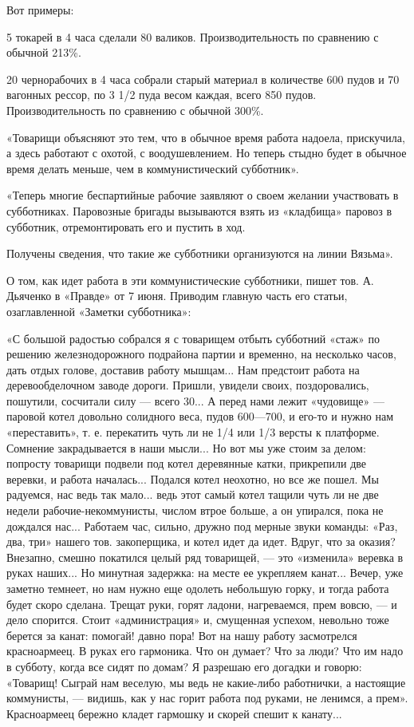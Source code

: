\documentclass[12pt]{article}
\newcommand{\parnum}{(\arabic{parcount})}
\newcounter{parcount}
\newenvironment{parnumbers}{%
  \par%
  \everypar{\noindent \stepcounter{parcount}\marginpar[]{\parnum}}%
}{}
\begin{document}
\begin{parnumbers}
Вот примеры:

5 токарей в 4 часа сделали 80 валиков. Производительность по сравнению с обычной 213\%.

20 чернорабочих в 4 часа собрали старый материал в количестве 600 пудов и 70 вагонных рессор, по 3 1/2 пуда весом каждая, всего 850 пудов. Производительность по сравнению с обычной 300\%.

«Товарищи объясняют это тем, что в обычное время работа надоела, прискучила, а здесь работают с охотой, с воодушевлением. Но теперь стыдно будет в обычное время делать меньше, чем в коммунистический субботник».

«Теперь многие беспартийные рабочие заявляют о своем желании участвовать в субботниках. Паровозные бригады вызываются взять из «кладбища» паровоз в субботник, отремонтировать его и пустить в ход.

Получены сведения, что такие же субботники организуются на линии Вязьма».

О том, как идет работа в эти коммунистические субботники, пишет тов. А. Дьяченко в «Правде» от 7 июня. Приводим главную часть его статьи, озаглавленной «Заметки субботника»:

«С большой радостью собрался я с товарищем отбыть субботний «стаж» по решению железнодорожного подрайона партии и временно, на несколько часов, дать отдых голове, доставив работу мышцам... Нам предстоит работа на деревообделочном заводе дороги. Пришли, увидели своих, поздоровались, пошутили, сосчитали силу — всего 30... А перед нами лежит «чудовище» — паровой котел довольно солидного веса, пудов 600—700, и его-то и нужно нам «переставить», т. е. перекатить чуть ли не 1/4 или 1/3 версты к платформе. Сомнение закрадывается в наши мысли... Но вот мы уже стоим за делом: попросту товарищи подвели под котел деревянные катки, прикрепили две веревки, и работа началась... Подался котел неохотно, но все же пошел. Мы радуемся, нас ведь так мало... ведь этот самый котел тащили чуть ли не две недели рабочие-некоммунисты, числом втрое больше, а он упирался, пока не дождался нас... Работаем час, сильно, дружно под мерные звуки команды: «Раз, два, три» нашего тов. закоперщика, и котел идет да идет. Вдруг, что за оказия? Внезапно, смешно покатился целый ряд товарищей, — это «изменила» веревка в руках наших... Но минутная задержка: на месте ее укрепляем канат... Вечер, уже заметно темнеет, но нам нужно еще одолеть небольшую горку, и тогда работа будет скоро сделана. Трещат руки, горят ладони, нагреваемся, прем вовсю, — и дело спорится. Стоит «администрация» и, смущенная успехом, невольно тоже берется за канат: помогай! давно пора! Вот на нашу работу засмотрелся красноармеец. В руках его гармоника. Что он думает? Что за люди? Что им надо в субботу, когда все сидят по домам? Я разрешаю его догадки и говорю: «Товарищ! Сыграй нам веселую, мы ведь не какие-либо работнички, а настоящие коммунисты, — видишь, как у нас горит работа под руками, не ленимся, а прем». Красноармеец бережно кладет гармошку и скорей спешит к канату...


\end{parnumbers}
\end{document}
